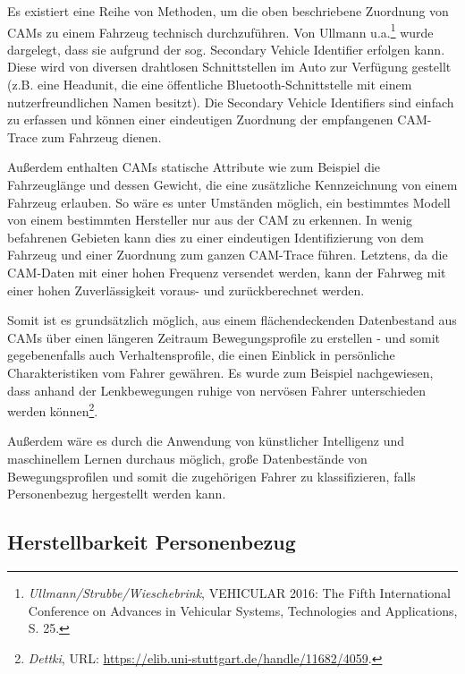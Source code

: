 Es existiert eine Reihe von Methoden, um die oben beschriebene Zuordnung von CAMs zu einem Fahrzeug technisch durchzuführen. Von Ullmann u.a.\footnote{\emph{Ullmann/Strubbe/Wieschebrink}, VEHICULAR 2016: The Fifth International Conference on Advances in Vehicular Systems, Technologies and Applications, S. 25.}\nocite{Ullmann2016} wurde dargelegt, dass sie aufgrund der sog. Secondary Vehicle Identifier erfolgen kann. Diese wird von diversen drahtlosen Schnittstellen im Auto zur Verfügung gestellt (z.B. eine Headunit, die eine öffentliche Bluetooth-Schnittstelle mit einem nutzerfreundlichen Namen besitzt). Die Secondary Vehicle Identifiers sind einfach zu erfassen und können einer eindeutigen Zuordnung der empfangenen CAM-Trace zum Fahrzeug dienen. 

Außerdem enthalten CAMs statische Attribute wie zum Beispiel die Fahrzeuglänge und dessen Gewicht, die eine zusätzliche Kennzeichnung von einem Fahrzeug erlauben. So wäre es unter Umständen möglich, ein bestimmtes Modell von einem bestimmten Hersteller nur aus der CAM zu erkennen. In wenig befahrenen Gebieten kann dies zu einer eindeutigen Identifizierung von dem Fahrzeug und einer Zuordnung zum ganzen CAM-Trace führen. Letztens, da die CAM-Daten mit einer hohen Frequenz versendet werden, kann der Fahrweg mit einer hohen Zuverlässigkeit voraus- und zurückberechnet werden. 

Somit ist es grundsätzlich möglich, aus einem flächendeckenden Datenbestand aus CAMs über einen längeren Zeitraum Bewegungsprofile zu erstellen - und somit gegebenenfalls auch Verhaltensprofile, die einen Einblick in persönliche Charakteristiken vom Fahrer gewähren. Es\nocite{Dettki2005} wurde zum Beispiel nachgewiesen, dass anhand der Lenkbewegungen ruhige von nervösen Fahrer unterschieden werden können\footnote{\emph{Dettki}, URL: \url{https://elib.uni-stuttgart.de/handle/11682/4059}.}. 

Außerdem wäre es durch die Anwendung von künstlicher Intelligenz und maschinellem Lernen durchaus möglich, große Datenbestände von Bewegungsprofilen und somit die zugehörigen Fahrer zu klassifizieren, falls Personenbezug hergestellt werden kann. 



\subsection{Herstellbarkeit Personenbezug}
\label{sec:SecondContentSection:SecondSubsection:SecondSubSubsection}

